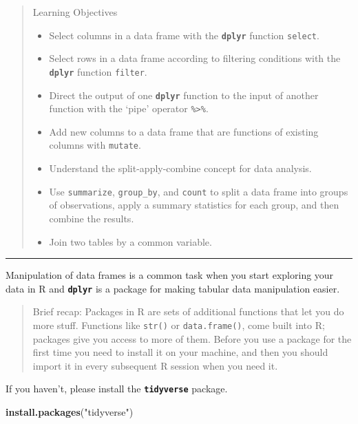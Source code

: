 \documentclass[
]{book}
\newenvironment{Shaded}{\begin{snugshade}}{\end{snugshade}}
\newcommand{\FunctionTok}[1]{\textcolor[rgb]{0.13,0.29,0.53}{\textbf{#1}}}
\newcommand{\NormalTok}[1]{#1}
\newcommand{\StringTok}[1]{\textcolor[rgb]{0.31,0.60,0.02}{#1}}
\providecommand{\tightlist}{%
  \setlength{\itemsep}{0pt}\setlength{\parskip}{0pt}}
\begin{document}
\begin{quote}
Learning Objectives

\begin{itemize}
\tightlist
\item
  Select columns in a data frame with the \textbf{\texttt{dplyr}} function \texttt{select}.
\item
  Select rows in a data frame according to filtering conditions with the \textbf{\texttt{dplyr}} function \texttt{filter}.
\item
  Direct the output of one \textbf{\texttt{dplyr}} function to the input of another function with the `pipe' operator \texttt{\%\textgreater{}\%}.
\item
  Add new columns to a data frame that are functions of existing columns with \texttt{mutate}.
\item
  Understand the split-apply-combine concept for data analysis.
\item
  Use \texttt{summarize}, \texttt{group\_by}, and \texttt{count} to split a data frame into groups of observations, apply a summary statistics for each group, and then combine the results.
\item
  Join two tables by a common variable.
\end{itemize}
\end{quote}

\begin{center}\rule{0.5\linewidth}{0.5pt}\end{center}

Manipulation of data frames is a common task when you start exploring your data in R and \textbf{\texttt{dplyr}} is a package for making tabular data manipulation easier.

\begin{quote}
Brief recap:
Packages in R are sets of additional functions that let you do more stuff. Functions like \texttt{str()} or \texttt{data.frame()}, come built into R; packages give you access to more of them. Before you use a package for the first time you need to install it on your machine, and then you should import it in every subsequent R session when you need it.
\end{quote}

If you haven't, please install the \textbf{\texttt{tidyverse}} package.

\begin{Shaded}
\begin{Highlighting}[]
\FunctionTok{install.packages}\NormalTok{(}\StringTok{"tidyverse"}\NormalTok{)    }
\end{Highlighting}
\end{Shaded}
\end{document}
